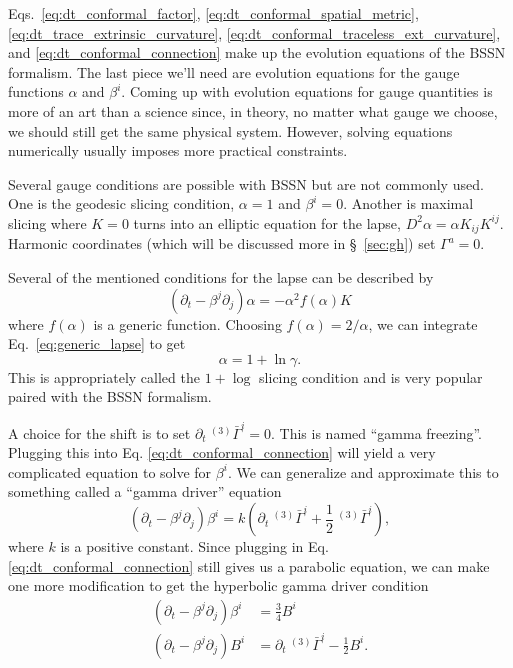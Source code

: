 \begin{bibunit}[unsrtnat]
Eqs.~\ref{eq:dt_conformal_factor}, \ref{eq:dt_conformal_spatial_metric},
\ref{eq:dt_trace_extrinsic_curvature}, \ref{eq:dt_conformal_traceless_ext_curvature},
and \ref{eq:dt_conformal_connection} make up the evolution equations of the BSSN
formalism. The last piece we'll need are evolution equations for the gauge
functions $\alpha$ and $\beta^i$. Coming up with evolution equations for gauge
quantities is more of an art than a science since, in theory, no matter what
gauge we choose, we should still get the same physical system. However, solving
equations numerically usually imposes more practical constraints.

Several gauge conditions are possible with BSSN but are not commonly used. One
is the geodesic slicing condition, $\alpha=1$ and $\beta^i=0$. Another is
maximal slicing where $K=0$ turns into an elliptic equation for the lapse,
$D^2\alpha = \alpha K_{ij}K^{ij}$. Harmonic coordinates (which will be discussed
more in \S~\ref{sec:gh}) set $\Gamma^a = 0$.

Several of the mentioned conditions for the lapse can be described by
\begin{equation}\label{eq:generic_lapse}
   (\partial_t -\beta^j\partial_j)\alpha = -\alpha^2 f(\alpha)K
\end{equation}
where $f(\alpha)$ is a generic function. Choosing $f(\alpha) = 2/\alpha$, we can
integrate Eq.~\ref{eq:generic_lapse} to get
\begin{equation}
   \alpha = 1 + \ln\gamma .
\end{equation}
This is appropriately called the $1+\log$ slicing condition and is very popular
paired with the BSSN formalism.

A choice for the shift is to set $\partial_t\ ^{(3)}\bar{\Gamma}^i = 0$. This is
named ``gamma freezing''. Plugging this into Eq.
\ref{eq:dt_conformal_connection} will yield a very complicated equation to solve
for $\beta^i$. We can generalize and approximate this to something called a
``gamma driver'' equation
\begin{equation}
   (\partial_t - \beta^j\partial_j)\beta^i = k(\partial_t\ ^{(3)}\bar{\Gamma}^i + 
      \frac{1}{2}\ ^{(3)}\bar{\Gamma}^i) ,
\end{equation}
where $k$ is a positive constant. Since plugging in Eq.
\ref{eq:dt_conformal_connection} still gives us a parabolic equation, we can
make one more modification to get the hyperbolic gamma driver condition
\begin{align}
   (\partial_t - \beta^j\partial_j)\beta^i &= \frac{3}{4}B^i \\
   (\partial_t - \beta^j\partial_j)B^i &= \partial_t\ ^{(3)}\bar{\Gamma}^i
      -\frac{1}{2} B^i.
\end{align}


\end{bibunit}
